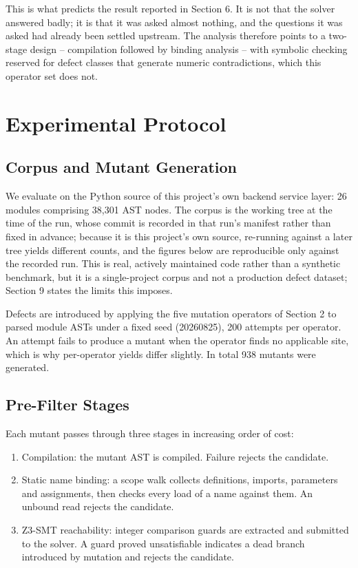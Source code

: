 \documentclass[10pt,journal,compsoc,twocolumn]{IEEEtran}
\begin{document}
This is what predicts the result reported in Section 6. It is not that the solver
answered badly; it is that it was asked almost nothing, and the questions it was
asked had already been settled upstream. The analysis therefore points to a
two-stage design -- compilation followed by binding analysis -- with symbolic
checking reserved for defect classes that generate numeric contradictions, which
this operator set does not.




\section{Experimental Protocol}



\subsection{Corpus and Mutant Generation}


We evaluate on the Python source of this project's own backend service layer: 26 modules comprising 38{,}301 AST nodes. The corpus is the working tree at the time of the run, whose commit is recorded in that run's manifest rather than fixed in advance; because it is this project's own source, re-running against a later tree yields different counts, and the figures below are reproducible only against the recorded run. This is real, actively maintained code rather than a synthetic benchmark, but it is a single-project corpus and not a production defect dataset; Section 9 states the limits this imposes.

Defects are introduced by applying the five mutation operators of Section 2 to parsed module ASTs under a fixed seed (20260825), 200 attempts per operator. An attempt fails to produce a mutant when the operator finds no applicable site, which is why per-operator yields differ slightly. In total 938 mutants were generated.


\subsection{Pre-Filter Stages}


Each mutant passes through three stages in increasing order of cost:
\begin{enumerate}
  \item Compilation: the mutant AST is compiled. Failure rejects the candidate.
  \item Static name binding: a scope walk collects definitions, imports, parameters and assignments, then checks every load of a name against them. An unbound read rejects the candidate.
  \item Z3-SMT reachability: integer comparison guards are extracted and submitted to the solver. A guard proved unsatisfiable indicates a dead branch introduced by mutation and rejects the candidate.
\end{enumerate}
\end{document}

